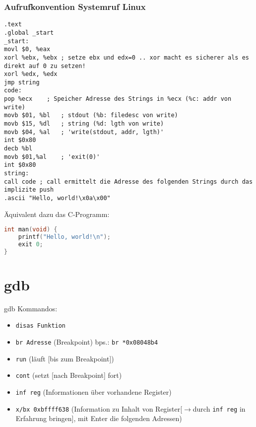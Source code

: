 \subsubsection*{Aufrufkonvention Systemruf Linux}
\begin{lstlisting}[language={[x86masm]Assembler}]
.text
.global _start
_start:
movl $0, %eax
xorl %ebx, %ebx	; setze ebx und edx=0 .. xor macht es sicherer als es direkt auf 0 zu setzen!
xorl %edx, %edx
jmp string
code:
pop %ecx	; Speicher Adresse des Strings in %ecx (%c: addr von write)
movb $01, %bl	; stdout (%b: filedesc von write)
movb $15, %dl	; string (%d: lgth von write)
movb $04, %al	; 'write(stdout, addr, lgth)'
int $0x80
decb %bl
movb $01,%al	; 'exit(0)'
int $0x80
string:
call code ; call ermittelt die Adresse des folgenden Strings durch das implizite push
.ascii "Hello, world!\x0a\x00"
\end{lstlisting}
Äquivalent dazu das C-Programm:
\begin{lstlisting}[language=C]
int man(void) {
	printf("Hello, world!\n");
	exit 0;
}
\end{lstlisting}

\section{gdb}
gdb Kommandos:
\begin{itemize}
\item \lstinline`disas Funktion`
\item \lstinline`br Adresse` (Breakpoint) bps.: \lstinline`br *0x08048b4`
\item \lstinline`run` (läuft [bis zum Breakpoint])
\item \lstinline`cont` (setzt [nach Breakpoint] fort)
\item \lstinline`inf reg` (Informationen über vorhandene Register)
\item \lstinline`x/bx 0xbffff638` (Information zu Inhalt von Register[$\to$durch \lstinline`inf reg` in Erfahrung bringen], mit Enter die folgenden Adressen)
\end{itemize}
